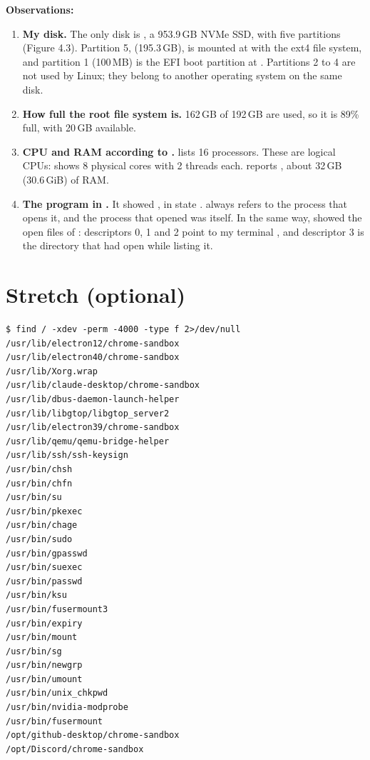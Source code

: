 \documentclass[11pt,a4paper]{article}
\begin{document}
\textbf{Observations:}
\begin{enumerate}
  \item \textbf{My disk.} The only disk is , a 953.9\,GB NVMe SSD, with five
  partitions (Figure 4.3). Partition 5,  (195.3\,GB), is mounted at \code{/}
  with the ext4 file system, and partition 1 (100\,MB) is the EFI boot partition at
  . Partitions 2 to 4 are not used by Linux; they belong to another operating
  system on the same disk.
  \item \textbf{How full the root file system is.} 162\,GB of 192\,GB are used, so it is 89\%
  full, with 20\,GB available.
  \item \textbf{CPU and RAM according to .}  lists 16
  processors. These are logical CPUs:  shows 8 physical cores with 2 threads each.
   reports , about 32\,GB (30.6\,GiB) of RAM.
  \item \textbf{The program in .} It showed , in state
  .  always refers to the process that opens it, and the
  process that opened  was  itself. In the same way,
   showed the open files of : descriptors 0, 1 and 2 point to
  my terminal , and descriptor 3 is the directory  that
   had open while listing it.
\end{enumerate}

\section{Stretch (optional)}

\begin{lstlisting}[caption={(b) The setuid programs on my laptop}]
$ find / -xdev -perm -4000 -type f 2>/dev/null
/usr/lib/electron12/chrome-sandbox
/usr/lib/electron40/chrome-sandbox
/usr/lib/Xorg.wrap
/usr/lib/claude-desktop/chrome-sandbox
/usr/lib/dbus-daemon-launch-helper
/usr/lib/libgtop/libgtop_server2
/usr/lib/electron39/chrome-sandbox
/usr/lib/qemu/qemu-bridge-helper
/usr/lib/ssh/ssh-keysign
/usr/bin/chsh
/usr/bin/chfn
/usr/bin/su
/usr/bin/pkexec
/usr/bin/chage
/usr/bin/sudo
/usr/bin/gpasswd
/usr/bin/suexec
/usr/bin/passwd
/usr/bin/ksu
/usr/bin/fusermount3
/usr/bin/expiry
/usr/bin/mount
/usr/bin/sg
/usr/bin/newgrp
/usr/bin/umount
/usr/bin/unix_chkpwd
/usr/bin/nvidia-modprobe
/usr/bin/fusermount
/opt/github-desktop/chrome-sandbox
/opt/Discord/chrome-sandbox
\end{lstlisting}
\end{document}

